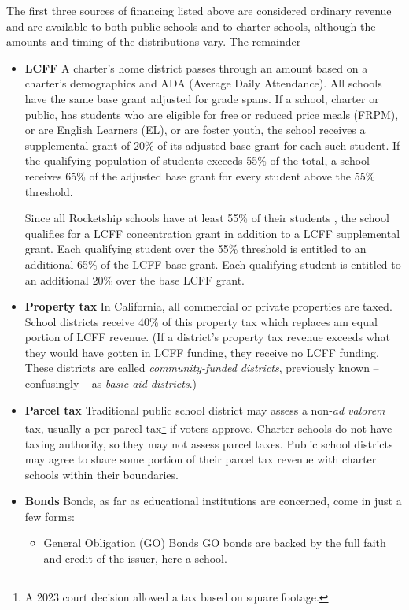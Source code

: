 The first three sources of financing listed above are considered ordinary revenue and are available to both public schools and to charter schools, although the amounts and timing of the distributions vary. The remainder 

\begin{itemize}
  \item \textbf{LCFF} A charter's home district passes through an amount based on a charter's demographics and ADA (Average Daily Attendance). All schools have the same base grant adjusted for grade spans. If a school, charter or public, has students who are eligible for free or reduced price meals (FRPM), or are English Learners (EL), or are foster youth, the school receives a supplemental grant of 20\% of its adjusted base grant for each such student. If the qualifying population of students exceeds 55\% of the total, a school receives 65\% of the adjusted base grant for every student above the 55\% threshold.

  Since all Rocketship schools have at least 55\% of their students , the school qualifies for a LCFF concentration grant in addition to a LCFF supplemental grant. Each qualifying student over the 55\% threshold is entitled to an additional 65\% of the LCFF base grant. Each qualifying student is entitled to an additional 20\% over the base LCFF grant.\\
  \item \textbf{Property tax} In California, all commercial or private properties are taxed. School districts receive 40\% of this property tax which replaces am equal portion of LCFF revenue. (If a district's property tax revenue exceeds what they would have gotten in LCFF funding, they receive no LCFF funding. These districts are called \textit{community-funded districts}, previously known – confusingly – as \textit{basic aid districts}.)
  \item \textbf{Parcel tax} Traditional public school district may assess a non-\textit{ad valorem} tax, usually a per parcel tax\footnote{A 2023 court decision allowed a tax based on square footage.} if voters approve. Charter schools do not have taxing authority, so they may not assess parcel taxes. Public school districts may agree to share some portion of their parcel tax revenue with charter schools within their boundaries.
  \item \textbf{Bonds} Bonds, as far as educational institutions are concerned, come in just a few forms:
  \begin{itemize}
    \item General Obligation (GO) Bonds
    GO bonds are backed by the full faith and credit of the issuer, here a school.


\end{itemize}
\end{itemize}
